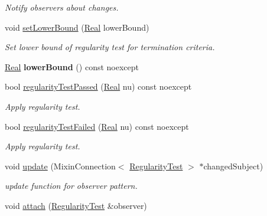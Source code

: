 \begin{DoxyCompactItemize}
\begin{DoxyCompactList}\small\item\em Notify observers about changes. \end{DoxyCompactList}\item 
\hypertarget{classSpacy_1_1Mixin_1_1RegularityTest_a051394f2ffb0abd9a26ab7a64c590eee}{}void \hyperlink{classSpacy_1_1Mixin_1_1RegularityTest_a051394f2ffb0abd9a26ab7a64c590eee}{set\+Lower\+Bound} (\hyperlink{classSpacy_1_1Real}{Real} lower\+Bound)\label{classSpacy_1_1Mixin_1_1RegularityTest_a051394f2ffb0abd9a26ab7a64c590eee}

\begin{DoxyCompactList}\small\item\em Set lower bound of regularity test for termination criteria. \end{DoxyCompactList}\item 
\hypertarget{classSpacy_1_1Mixin_1_1RegularityTest_a8a807e4449e6b6b64e7e81834d331597}{}\hyperlink{classSpacy_1_1Real}{Real} {\bfseries lower\+Bound} () const noexcept\label{classSpacy_1_1Mixin_1_1RegularityTest_a8a807e4449e6b6b64e7e81834d331597}

\item 
bool \hyperlink{classSpacy_1_1Mixin_1_1RegularityTest_afe2fd3259850b874a85779d4f562e7f6}{regularity\+Test\+Passed} (\hyperlink{classSpacy_1_1Real}{Real} nu) const noexcept
\begin{DoxyCompactList}\small\item\em Apply regularity test. \end{DoxyCompactList}\item 
bool \hyperlink{classSpacy_1_1Mixin_1_1RegularityTest_a26217e26765bb6f938224ea76612c8c0}{regularity\+Test\+Failed} (\hyperlink{classSpacy_1_1Real}{Real} nu) const noexcept
\begin{DoxyCompactList}\small\item\em Apply regularity test. \end{DoxyCompactList}\item 
\hypertarget{classSpacy_1_1Mixin_1_1RegularityTest_ae3bfc55bec9fe3068adffb6d24b3b964}{}void \hyperlink{classSpacy_1_1Mixin_1_1RegularityTest_ae3bfc55bec9fe3068adffb6d24b3b964}{update} (Mixin\+Connection$<$ \hyperlink{classSpacy_1_1Mixin_1_1RegularityTest_ae2887fec9a5bdd42239b3df6750bf2e9}{Regularity\+Test} $>$ $\ast$changed\+Subject)\label{classSpacy_1_1Mixin_1_1RegularityTest_ae3bfc55bec9fe3068adffb6d24b3b964}

\begin{DoxyCompactList}\small\item\em update function for observer pattern. \end{DoxyCompactList}\item 
\hypertarget{classSpacy_1_1Mixin_1_1MixinConnection_abb5520ee6b22dd993d78f142939a1ed4}{}void \hyperlink{classSpacy_1_1Mixin_1_1MixinConnection_abb5520ee6b22dd993d78f142939a1ed4}{attach} (\hyperlink{classSpacy_1_1Mixin_1_1RegularityTest_ae2887fec9a5bdd42239b3df6750bf2e9}{Regularity\+Test} \&observer)\label{classSpacy_1_1Mixin_1_1MixinConnection_abb5520ee6b22dd993d78f142939a1ed4}


\end{DoxyCompactItemize}
